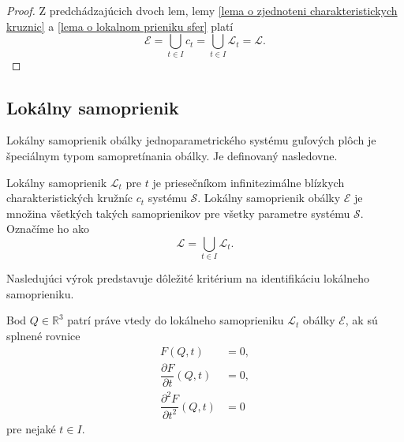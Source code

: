 \begin{proof}
Z predchádzajúcich dvoch lem, lemy \ref{lema o zjednoteni charakteristickych kruznic} a \ref{lema o lokalnom prieniku sfer} platí 
$$ \mathcal{E} = \bigcup_{t \in I } c_t = \bigcup_{t \in I} \mathcal{L}_t = \mathcal{L}. $$
\end{proof}

\subsection{Lokálny samoprienik}
Lokálny samoprienik obálky jednoparametrického systému guľových plôch je špeciálnym typom samopretínania obálky. Je definovaný nasledovne.
\begin{definition} \label{definicia lokalny samoprienik}
Lokálny samoprienik $\mathcal{L}_{t}$ pre $t$ je priesečníkom infinitezimálne blízkych charakteristických kružníc $c_{t}$ systému $\mathcal{S}$. Lokálny samoprienik obálky $\mathcal{E}$ je množina všetkých takých samoprienikov pre všetky parametre systému $\mathcal{S}$. Označíme ho ako $$\mathcal{L} = \bigcup_{t \in I} \mathcal{L}_t.$$
\end{definition}

Nasledujúci výrok predstavuje dôležité kritérium na identifikáciu lokálneho samoprieniku.
\begin{lemma} \label{kriterium o lokalnom samoprieniku}
Bod $Q \in \mathbb{R}^3$ patrí práve vtedy do lokálneho samoprieniku $\mathcal{L}_{t}$ obálky $\mathcal{E}$, ak sú splnené rovnice
\begin{align*}
F(Q,t) &= 0, \\
\dfrac{\partial F}{\partial t}(Q,t) &= 0, \\
\dfrac{\partial^2 F}{\partial t^2}(Q,t) &= 0
\end{align*}
pre nejaké $t \in I.$
\end{lemma}

